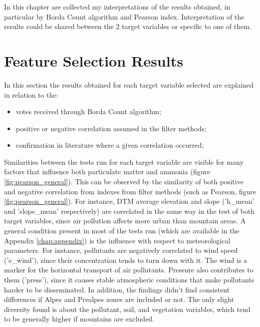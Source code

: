 In this chapter are collected my interpretations of the results obtained, in particular by Borda Count algorithm and Pearson index. Interpretation of the results could be shared between the 2 target variables or specific to one of them.

\section{Feature Selection Results}
In this section the results obtained for each target variable selected are explained in relation to the:
\begin{itemize}
    \item votes received through Borda Count algorithm;
    \item positive or negative correlation assumed in the filter methods;
    \item confirmation in literature where a given correlation occurred; 
\end{itemize}
Similarities between the tests run for each target variable are visible for many factors that influence both particulate matter and ammonia (figure \ref{fig:pearson_general}).
This can be observed by the similarity of both positive and negative correlation from indexes from filter methods (such as Pearson, figure \ref{fig:pearson_general}). 
For instance, DTM average elevation and slope ('h\_mean' and 'slope\_mean' respectively) are correlated in the same way in the test of both target variables, since air pollution affects more urban than mountain areas.
A general condition present in most of the tests run (which are available in the Appendix \ref{chap:appendix}) is the influence with respect to meteorological parameters.
For instance, pollutants are negatively correlated to wind speed ('e\_wind'), since their concentration tends to turn down with it. The wind is a marker for the horizontal transport of air pollutants. Pressure also contributes to them ('press'), since it causes stable atmospheric conditions that make pollutants harder to be disseminated. 
In addition, the findings didn't find consistent differences if Alpes and Prealpes zones are included or not. The only slight diversity found is about the pollutant, soil, and vegetation variables, which tend to be generally higher if mountains are excluded.

